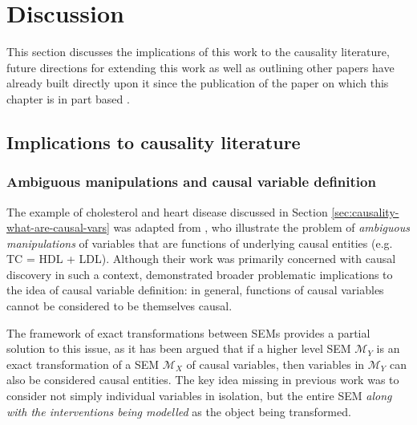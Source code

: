 \medskip






\section{Discussion}\label{sec:causality-discussion}

This section discusses the implications of this work to the causality literature, future directions for extending this work as well as outlining other papers have already built directly upon it since the publication of the paper on which this chapter is in part based \citep{rubenstein2017causal}.

\subsection{Implications to causality literature}

\subsubsection{Ambiguous manipulations and causal variable definition}
The example of cholesterol and heart disease discussed in Section \ref{sec:causality-what-are-causal-vars} was adapted from \cite{spirtes2004causal}, who illustrate the problem of \emph{ambiguous manipulations} of variables that are functions of underlying causal entities (e.g. TC = HDL + LDL).
Although their work was primarily concerned with causal discovery in such a context, \cite{eberhardt2016green} demonstrated broader problematic implications to the idea of causal variable definition: in general, functions of causal variables cannot be considered to be themselves causal.

The framework of exact transformations between SEMs provides a partial solution to this issue, as it has been argued that if a higher level SEM $\mathcal{M}_Y$ is an exact transformation of a SEM $\mathcal{M}_X$ of causal variables, then variables in $\mathcal{M}_Y$ can also be considered causal entities. 
The key idea missing in previous work was to consider not simply individual variables in isolation, but the entire SEM \emph{along with the interventions being modelled} as the object being transformed.


